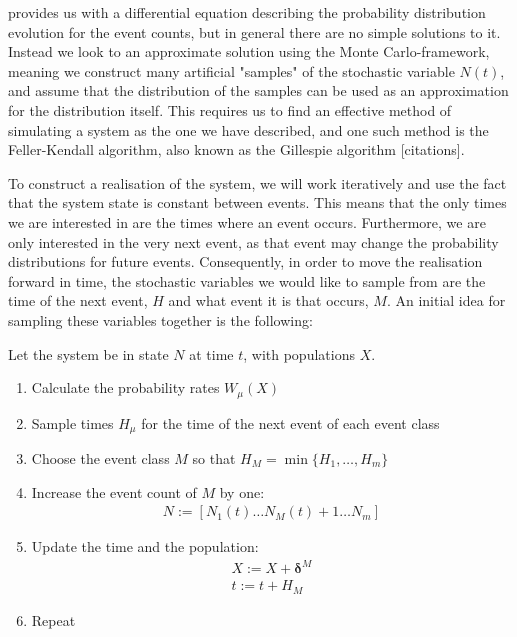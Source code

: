 \documentclass[10pt,a4paper]{article}
\begin{document}
 provides us with a differential equation describing the probability distribution evolution for the event counts, but in general there are no simple solutions to it. Instead we look to an approximate solution using the Monte Carlo-framework, meaning we construct many artificial "samples" of the stochastic variable $N \left( t \right)$, and assume that the distribution of the samples can be used as an approximation for the distribution itself. This requires us to find an effective method of simulating a system as the one we have described, and one such method is the Feller-Kendall algorithm, also known as the Gillespie algorithm [citations].

To construct a realisation of the system, we will work iteratively and use the fact that the system state is constant between events. This means that the only times we are interested in are the times where an event occurs. Furthermore, we are only interested in the very next event, as that event may change the probability distributions for future events. Consequently, in order to move the realisation forward in time, the stochastic variables we would like to sample from are the time of the next event, $H$ and what event it is that occurs, $M$. An initial idea for sampling these variables together is the following:

\begin{algorithm} Let the system be in state $N$ at time $t$, with populations $X$. \label{algorithm:bad}
	\begin{enumerate}
		\item Calculate the probability rates $W_\mu \left( X \right)$
		\item Sample times $H_\mu$ for the time of the next event of each event class
		\item Choose the event class $M$ so that $H_M = \min \{ H_1, \ldots, H_m \}$
		\item Increase the event count of $M$ by one:
			\begin{align*}
				N := \left[ N_1\left(t \right) \ldots N_M \left( t \right) + 1 \ldots N_m \right]
			\end{align*}
		\item Update the time and the population:
			\begin{align*}
				X := X + \bm{\delta}^{M} \\
				t := t + H_M
			\end{align*}
		\item Repeat
	\end{enumerate}
\end{algorithm}
\end{document}
